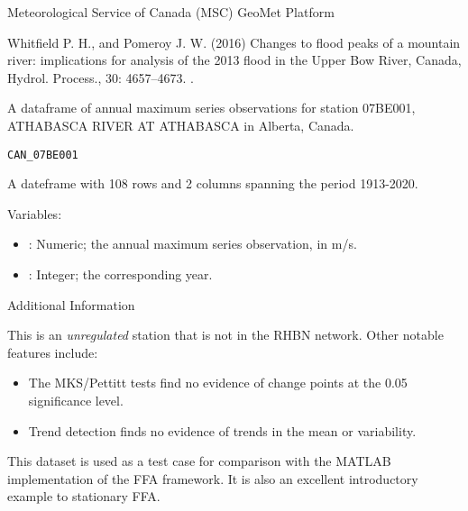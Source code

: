 \documentclass[a4paper]{book}
\begin{document}
%
\begin{Source}
Meteorological Service of Canada (MSC) GeoMet Platform
\end{Source}
%
\begin{References}
Whitfield P. H., and Pomeroy J. W. (2016) Changes to flood peaks of a mountain river:
implications for analysis of the 2013 flood in the Upper Bow River, Canada,
Hydrol. Process., 30: 4657–4673. .
\end{References}
%
\begin{Description}
A dataframe of annual maximum series observations for
station 07BE001, ATHABASCA RIVER AT ATHABASCA in Alberta, Canada.
\end{Description}
%
\begin{Usage}
\begin{verbatim}
CAN_07BE001
\end{verbatim}
\end{Usage}
%
\begin{Format}
A dateframe with 108 rows and 2 columns spanning the period 1913-2020.
\end{Format}
%
\begin{Details}
Variables:
\begin{itemize}

\item{} : Numeric; the annual maximum series observation, in m/s.
\item{} : Integer; the corresponding year.

\end{itemize}

\end{Details}
%
\begin{Section}{Additional Information}

This is an \emph{unregulated} station that is not in the RHBN network. Other notable features include:
\begin{itemize}

\item{} The MKS/Pettitt tests find no evidence of change points at the 0.05 significance level.
\item{} Trend detection finds no evidence of trends in the mean or variability.

\end{itemize}


This dataset is used as a test case for comparison with the MATLAB implementation of the
FFA framework. It is also an excellent introductory example to stationary FFA.
\end{Section}
\end{document}
